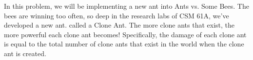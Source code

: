 In this problem, we will be implementing a new ant into Ants vs. Some Bees. 
The bees are winning too often, so deep in the research labs of CSM 61A, we've developed a new ant.
called a Clone Ant. The more clone ants that exist, the more powerful each clone ant becomes! Specifically,
the damage of each clone ant is equal to the total number of clone ants that exist in the world when the clone ant is created.
